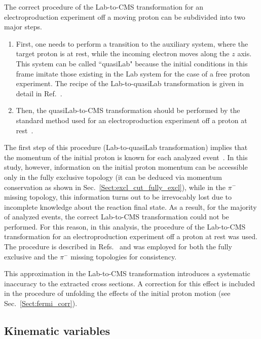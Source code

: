 \documentclass[prc,twocolumn,superscriptaddress,showpacs,amssymb,amsmath,amsfonts,aps,nofootinbib]{revtex4-1}
\begin{document}
The correct procedure of the Lab-to-CMS transformation for an electroproduction experiment off a moving proton can be subdivided into two major steps.

\begin{enumerate}
\item First, one needs to perform a transition to the auxiliary system, where the target proton is at rest, while the incoming electron moves along the $z$ axis. This system can be called ``quasiLab" because the initial conditions in this frame imitate those existing in the Lab system for the case of a free proton experiment. The recipe of the Lab-to-quasiLab transformation is given in detail in Ref.\!~\cite{twopeg-d}.

\item Then, the quasiLab-to-CMS transformation should be performed by the standard method used for an electroproduction experiment off a proton at rest~\cite{Fed_an_note:2017,Fed_paper_2018,my_an_note:2020, my_thesis:2021}.
\end{enumerate}


The first step of this procedure (Lab-to-quasiLab transformation) implies that the momentum of the initial proton is known for each analyzed event~\cite{twopeg-d}. In this study, however, information on the initial proton momentum can be accessible only in the fully exclusive topology (it can be deduced via momentum conservation as shown in Sec.\!~\ref{Sect:excl_cut_fully_excl}), while in the $\pi^{-}$ missing topology, this information turns out to be irrevocably lost due to incomplete knowledge about the reaction final state. As a result, for the majority of analyzed events, the correct Lab-to-CMS transformation could not be performed. For this reason, in this analysis, the procedure of the Lab-to-CMS transformation for an electroproduction experiment off a proton at rest was used. The procedure is described in Refs.\!~\cite{Fed_an_note:2017,Fed_paper_2018,my_an_note:2020, my_thesis:2021} and was employed for both the fully exclusive and the $\pi^{-}$ missing topologies for consistency.


This approximation in the Lab-to-CMS transformation introduces a systematic inaccuracy to the extracted cross sections. A correction for this effect is included in the procedure of unfolding the effects of the initial proton motion (see Sec.\!~\ref{Sect:fermi_corr}).



\subsection{Kinematic variables}
\label{Sect:kin_var}
\end{document}
